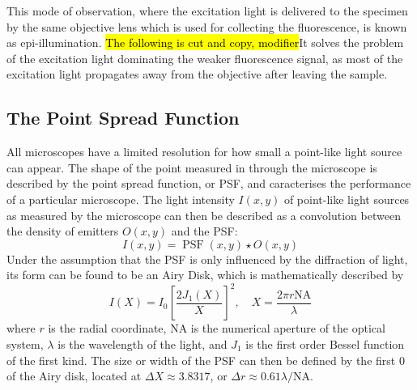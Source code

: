 This mode of observation, where the excitation light is delivered to the specimen by the same objective lens which is used for collecting the fluorescence, 
is known as epi-illumination.
\hl{The following is cut and copy, modifier}It solves the problem of the excitation light dominating the weaker fluorescence signal, as most of the excitation light propagates away from the objective after leaving  the sample.



\subsection{The Point Spread Function}
All microscopes have a limited resolution for how small a point-like light source can appear. The shape of the point measured in through the microscope is described by the point spread function, or PSF, and caracterises the performance of a particular microscope. The light intensity $I(x, y)$ of point-like light sources as measured by the microscope can then be described as a convolution between the density of emitters $O(x, y)$ and the PSF:
\begin{equation}
    I(x, y) = \operatorname{PSF}(x, y) \star O(x, y)
\end{equation}
Under the assumption that the PSF is only influenced by the diffraction of light, its form can be found to be an Airy Disk, which is mathematically described by
\begin{equation}
    I(X) = I_0 \left[ \frac{2 J_1(X)}{X} \right]^{2}, \quad X = \frac{2\pi r \textrm{NA}}{\lambda}
\end{equation}
where $r$ is the radial coordinate, NA is the numerical aperture of the optical system, $\lambda$ is the wavelength of the light, and $J_1$ is the first order Bessel function of the first kind. The size or width of the PSF can then be defined by the first $0$ of the Airy disk, located at $\Delta X \approx 3.8317$, or $\Delta r \approx 0.61 \lambda / \textrm{NA}$.

